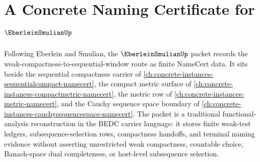 \chapter{A Concrete Naming Certificate for $\EberleinSmulianUp$}
\label{ch:concrete-instances-eberlein-smulian-namecert}

Following Eberlein and Smulian, the $\EberleinSmulianUp$ packet records the weak-compactness-to-sequential-window route as finite NameCert data. It sits beside the sequential compactness carrier of \autoref{ch:concrete-instances-sequentialcompact-namecert}, the compact metric surface of \autoref{ch:concrete-instances-compactmetric-namecert}, the metric row of \autoref{ch:concrete-instances-metric-namecert}, and the Cauchy sequence space boundary of \autoref{ch:concrete-instances-cauchysequencespace-namecert}. The packet is a traditional functional-analysis reconstruction in the BEDC carrier language: it stores finite weak-test ledgers, subsequence-selection rows, compactness handoffs, and terminal naming evidence without asserting unrestricted weak compactness, countable choice, Banach-space dual completeness, or host-level subsequence selection.

